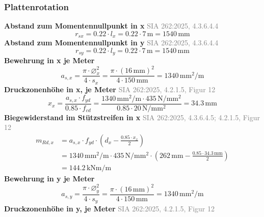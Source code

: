 \documentclass[11pt,a4paper]{article}
\newcommand{\normref}[1]{{\small\textcolor{gray}{#1}}}
\begin{document}
\subsubsection{Plattenrotation}
\noindent\textbf{Abstand zum Momentennullpunkt in x} \hfill \normref{SIA 262:2025, 4.3.6.4.4}
\begin{equation*}
r_{sx} = 0.22 \cdot l_x = 0.22 \cdot 7\,\mathrm{m} = 1540\,\mathrm{mm}
\end{equation*}
\noindent\textbf{Abstand zum Momentennullpunkt in y} \hfill \normref{SIA 262:2025, 4.3.6.4.4}
\begin{equation*}
r_{sy} = 0.22 \cdot l_y = 0.22 \cdot 7\,\mathrm{m} = 1540\,\mathrm{mm}
\end{equation*}
\noindent\textbf{Bewehrung in x je Meter}
\begin{equation*}
a_{s,x} = \frac{\pi \cdot \varnothing_x^{2}}{4 \cdot s_x} = \frac{\pi \cdot \left(16\,\mathrm{mm}\right)^{2}}{4 \cdot 150\,\mathrm{mm}} = 1340\,\mathrm{mm}^{2}/\mathrm{m}
\end{equation*}
\noindent\textbf{Druckzonenhöhe in x, je Meter} \hfill \normref{SIA 262:2025, 4.2.1.5, Figur 12}
\begin{equation*}
x_x = \frac{a_{s,x} \cdot f_{yd}}{0.85 \cdot f_{cd}} = \frac{1340\,\mathrm{mm}^{2}/\mathrm{m} \cdot 435\,\mathrm{N}/\mathrm{mm}^{2}}{0.85 \cdot 20\,\mathrm{N}/\mathrm{mm}^{2}} = 34.3\,\mathrm{mm}
\end{equation*}
\noindent\textbf{Biegewiderstand im Stützstreifen in x} \hfill \normref{SIA 262:2025, 4.3.6.4.5; 4.2.1.5, Figur 12}
\begin{equation*}
\begin{aligned}
  m_{Rd,x} &= a_{s,x} \cdot f_{yd} \cdot \left(d_x - \frac{0.85 \cdot x_x}{2}\right) \\
  &= 1340\,\mathrm{mm}^{2}/\mathrm{m} \cdot 435\,\mathrm{N}/\mathrm{mm}^{2} \cdot \left(262\,\mathrm{mm} - \frac{0.85 \cdot 34.3\,\mathrm{mm}}{2}\right) \\
  &= 144.2\,\mathrm{kNm}/\mathrm{m}
\end{aligned}
\end{equation*}
\noindent\textbf{Bewehrung in y je Meter}
\begin{equation*}
a_{s,y} = \frac{\pi \cdot \varnothing_y^{2}}{4 \cdot s_y} = \frac{\pi \cdot \left(16\,\mathrm{mm}\right)^{2}}{4 \cdot 150\,\mathrm{mm}} = 1340\,\mathrm{mm}^{2}/\mathrm{m}
\end{equation*}
\noindent\textbf{Druckzonenhöhe in y, je Meter} \hfill \normref{SIA 262:2025, 4.2.1.5, Figur 12}
\end{document}
